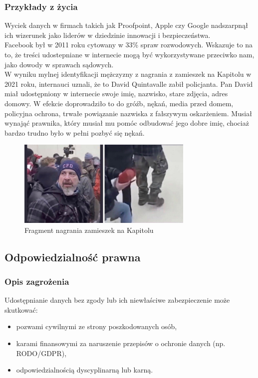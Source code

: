 \subsubsection{Przykłady z życia}
Wyciek danych w firmach takich jak Proofpoint, Apple czy Google nadszarpnął ich wizerunek jako liderów w dziedzinie innowacji i bezpieczeństwa.\\

Facebook był w 2011 roku cytowany w 33\% spraw rozwodowych. Wskazuje to na to, że treści udostepniane w internecie mogą być wykorzystywane przeciwko nam, jako dowody w sprawach sądowych.\\

W wyniku mylnej identyfikacji mężczyzny z nagrania z zamieszek na Kapitolu w 2021 roku, internauci uznali, że to David Quintavalle zabił policjanta. Pan David miał udostępniony w internecie swoje imię, nazwisko, stare zdjęcia, adres domowy. W efekcie doprowadziło to do gróźb, nękań, media przed domem, policyjna ochrona, trwałe powiązanie nazwiska z fałszywym oskarżeniem. Musiał wynająć prawnika, który musiał mu pomóc odbudować jego dobre imię, chociaż bardzo trudno było w pełni pozbyć się nękań.

\begin{figure}[H]
  \centering
  \includegraphics[width=0.75\textwidth]{images/david.jpg}
  \caption{Fragment nagrania zamieszek na Kapitolu}
  \label{fig:david}
\end{figure} 

\subsection{Odpowiedzialność prawna}
\subsubsection{Opis zagrożenia}
Udostępnianie danych bez zgody lub ich niewłaściwe zabezpieczenie może skutkować:
\begin{itemize}
\item pozwami cywilnymi ze strony poszkodowanych osób,
\item karami finansowymi za naruszenie przepisów o ochronie danych (np. RODO/GDPR),
\item odpowiedzialnością dyscyplinarną lub karną.
\end{itemize}

